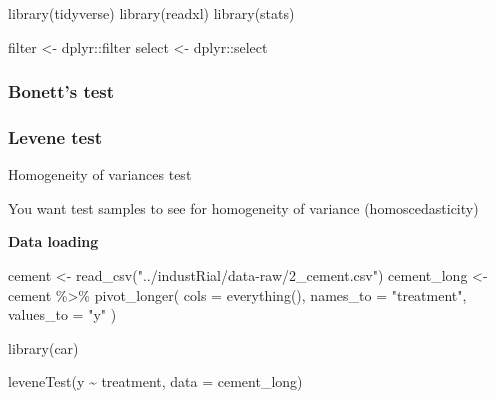\documentclass[
]{book}
\newenvironment{Shaded}{\begin{snugshade}}{\end{snugshade}}
\newcommand{\AttributeTok}[1]{\textcolor[rgb]{0.77,0.63,0.00}{#1}}
\newcommand{\FunctionTok}[1]{\textcolor[rgb]{0.00,0.00,0.00}{#1}}
\newcommand{\NormalTok}[1]{#1}
\newcommand{\OtherTok}[1]{\textcolor[rgb]{0.56,0.35,0.01}{#1}}
\newcommand{\SpecialCharTok}[1]{\textcolor[rgb]{0.00,0.00,0.00}{#1}}
\newcommand{\StringTok}[1]{\textcolor[rgb]{0.31,0.60,0.02}{#1}}
\begin{document}
\begin{Shaded}
\begin{Highlighting}[]
\FunctionTok{library}\NormalTok{(tidyverse)}
\FunctionTok{library}\NormalTok{(readxl)}
\FunctionTok{library}\NormalTok{(stats)}

\NormalTok{filter }\OtherTok{\textless{}{-}}\NormalTok{ dplyr}\SpecialCharTok{::}\NormalTok{filter}
\NormalTok{select }\OtherTok{\textless{}{-}}\NormalTok{ dplyr}\SpecialCharTok{::}\NormalTok{select}
\end{Highlighting}
\end{Shaded}

\hypertarget{bonetts-test}{%
\subsubsection{Bonett's test}\label{bonetts-test}}

\hypertarget{leveneTest}{%
\subsubsection{Levene test}\label{leveneTest}}

Homogeneity of variances test

You want test samples to see for homogeneity of variance (homoscedasticity)

\textbf{Data loading}

\begin{Shaded}
\begin{Highlighting}[]
\NormalTok{cement }\OtherTok{\textless{}{-}} \FunctionTok{read\_csv}\NormalTok{(}\StringTok{"../industRial/data{-}raw/2\_cement.csv"}\NormalTok{)}
\NormalTok{cement\_long }\OtherTok{\textless{}{-}}\NormalTok{ cement }\SpecialCharTok{\%\textgreater{}\%}
  \FunctionTok{pivot\_longer}\NormalTok{(}
    \AttributeTok{cols =} \FunctionTok{everything}\NormalTok{(), }\AttributeTok{names\_to =} \StringTok{"treatment"}\NormalTok{, }\AttributeTok{values\_to =} \StringTok{"y"}
\NormalTok{  )}
\end{Highlighting}
\end{Shaded}

\begin{Shaded}
\begin{Highlighting}[]
\FunctionTok{library}\NormalTok{(car)}
\end{Highlighting}
\end{Shaded}

\begin{Shaded}
\begin{Highlighting}[]
\FunctionTok{leveneTest}\NormalTok{(y }\SpecialCharTok{\textasciitilde{}}\NormalTok{ treatment, }\AttributeTok{data =}\NormalTok{ cement\_long)}
\end{Highlighting}
\end{Shaded}
\end{document}
